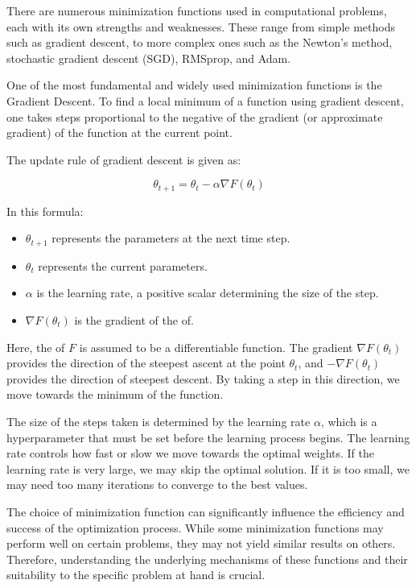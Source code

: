 \documentclass[
  a4paper,  %
  twoside,  %
  bibliography=totoc,
  headsepline,
  cleardoublepage=empty,
  parskip=half,
  draft=false
]{scrbook}
\begin{document}
There are numerous minimization functions used in computational problems, each with its own strengths and weaknesses.
These range from simple methods such as gradient descent, to more complex ones such as the Newton's method, stochastic gradient descent (SGD), RMSprop, and Adam.

One of the most fundamental and widely used minimization functions is the Gradient Descent.
To find a local minimum of a function using gradient descent, one takes steps proportional to the negative of the gradient (or approximate gradient) of the function at the current point.

The update rule of gradient descent is given as:

\[
\theta_{t+1} = \theta_t - \alpha \nabla F(\theta_t)
\]

In this formula:

\begin{itemize}
  \item \(\theta_{t+1}\) represents the parameters at the next time step.
  \item \(\theta_t\) represents the current parameters.
  \item \(\alpha\) is the learning rate, a positive scalar determining the size of the step.
  \item \(\nabla F(\theta_t)\) is the gradient of the \gls{of}.
\end{itemize}

Here, the \gls{of} \(F\) is assumed to be a differentiable function.
The gradient \(\nabla F(\theta_t)\) provides the direction of the steepest ascent at the point \(\theta_t\), and \(-\nabla F(\theta_t)\) provides the direction of steepest descent.
By taking a step in this direction, we move towards the minimum of the function.

The size of the steps taken is determined by the learning rate \(\alpha\), which is a hyperparameter that must be set before the learning process begins.
The learning rate controls how fast or slow we move towards the optimal weights.
If the learning rate is very large, we may skip the optimal solution.
If it is too small, we may need too many iterations to converge to the best values.

The choice of minimization function can significantly influence the efficiency and success of the optimization process.
While some minimization functions may perform well on certain problems, they may not yield similar results on others.
Therefore, understanding the underlying mechanisms of these functions and their suitability to the specific problem at hand is crucial.
\end{document}
